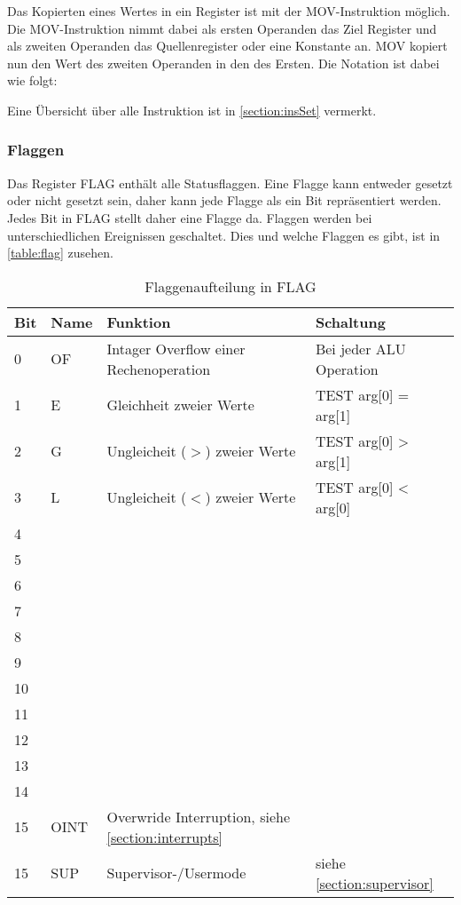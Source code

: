 \documentclass{scrartcl}
\begin{document}
Das Kopierten eines Wertes in ein Register ist mit der MOV-Instruktion möglich. Die MOV-Instruktion nimmt dabei als ersten Operanden das Ziel Register und als zweiten Operanden das Quellenregister oder eine Konstante an. MOV kopiert nun den Wert des zweiten Operanden in den des Ersten. Die Notation ist dabei wie folgt: 


Eine Übersicht über alle Instruktion ist in \autoref{section:insSet} vermerkt.

\subsubsection{\label{section:flags}Flaggen}

Das Register FLAG enthält alle Statusflaggen. Eine Flagge kann entweder gesetzt oder nicht gesetzt sein, daher kann jede Flagge als ein Bit repräsentiert werden. Jedes Bit in FLAG stellt daher eine Flagge da. Flaggen werden bei unterschiedlichen Ereignissen geschaltet. Dies und welche Flaggen es gibt, ist in \autoref{table:flag} zusehen.

\begin{center}
	\begin{table}[h]
		\caption{\label{table:flag}Flaggenaufteilung in FLAG}
		\begin{tabular}{l | l | l | l}
			Bit & Name & Funktion & Schaltung \\
			\hline
			 0 & OF  & Intager Overflow einer Rechenoperation & Bei jeder ALU Operation\\
			 1 & E   & Gleichheit zweier Werte & TEST arg[0] = arg[1]\\
			 2 & G   & Ungleicheit ($>$) zweier Werte & TEST arg[0] > arg[1]\\
			 3 & L   & Ungleicheit ($<$) zweier Werte & TEST arg[0] < arg[0]\\
			 4 &  &  &  \\
			 5 &  &  &  \\
			 6 &  &  &  \\
			 7 &  &  &  \\
			 8 &  &  &  \\
			 9 &  &  &  \\
			10 &  &  &  \\
			11 &  &  &  \\
			12 &  &  &  \\
			13 &  &  &  \\
			14 &  &  &  \\
			15 & OINT & Overwride Interruption, siehe \autoref{section:interrupts} &  \\
			15 & SUP & Supervisor-/Usermode & siehe \autoref{section:supervisor} 
		\end{tabular}
	\end{table}
\end{center}
\end{document}
